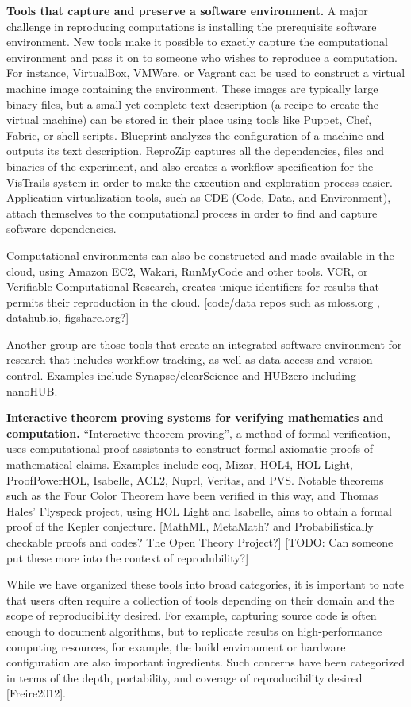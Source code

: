 \documentclass[11pt]{article}
\newcommand{\todo}[1]{{\color{red} [TODO: #1]}}
\newcommand{\comment}[1]{{\color{blue} [#1]}}
\newcommand{\todo}[1]{}
\newcommand{\comment}[1]{}
\begin{document}
{\bf Tools that capture and preserve a software environment.}  A major challenge
in reproducing computations is installing the prerequisite software
environment. New tools make it possible to exactly capture the computational
environment and pass it on to someone who wishes to reproduce a computation.
For instance, VirtualBox, VMWare, or Vagrant can be used to construct a
virtual machine image containing the environment.  These images are
typically large binary files, but a small yet complete text description (a
recipe to create the virtual machine) can be stored in their place using
tools like Puppet, Chef, Fabric, or shell scripts. Blueprint analyzes the
configuration of a machine and outputs its text description. ReproZip
captures all the dependencies, files and binaries of the experiment, and
also creates a workflow specification for the VisTrails system in order to make the
execution and exploration process easier. Application virtualization tools,
such as CDE (Code, Data, and Environment), attach themselves to the
computational process in order to find and capture software dependencies.

Computational environments can also be constructed and made available in the
cloud, using Amazon EC2, Wakari, RunMyCode and other tools. VCR, or
Verifiable Computational Research, creates unique identifiers for results
that permits their reproduction in the cloud. 
\comment{code/data repos such as mloss.org , datahub.io, figshare.org?}

Another group are those tools that create an integrated software environment
for research that includes workflow tracking, as well as data access and
version control. Examples include Synapse/clearScience and HUBzero
including nanoHUB.


{\bf Interactive theorem proving systems for verifying mathematics and
computation.}  ``Interactive theorem proving'', a method of formal
verification, uses computational proof assistants to construct formal
axiomatic proofs of mathematical claims. Examples include
coq, Mizar, HOL4, HOL
Light, ProofPowerHOL, Isabelle, ACL2, Nuprl, Veritas, and PVS. Notable theorems
such as the Four Color Theorem have been verified in this way, and Thomas
Hales’ Flyspeck project, using HOL Light and Isabelle, aims to obtain a
formal proof of the Kepler conjecture.
\comment{MathML, MetaMath? and Probabilistically checkable proofs and codes? The
Open Theory Project?}
\todo{Can someone put these more into the context of reprodubility?}

While we have organized these tools into broad categories, it is important to
note that users often require a collection of tools depending on their
domain and the scope of reproducibility desired.  For example, capturing
source code is often enough to document algorithms, but to
replicate results on high-performance computing resources, for example, the
build environment or hardware configuration are also important ingredients.  
Such concerns have been categorized in terms of
the depth, portability, and coverage of reproducibility desired [Freire2012].
\end{document}
